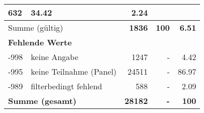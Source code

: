 \begin{longtable}{lXrrr}
       \num{632} &
       \num[round-mode=places,round-precision=2]{34.42} &
         \num[round-mode=places,round-precision=2]{2.24} \\
     \midrule
     \multicolumn{2}{l}{Summe (gültig)} &
       \textbf{\num{1836}} &
     \textbf{100} &
       \textbf{\num[round-mode=places,round-precision=2]{6.51}} \\
     \multicolumn{5}{l}{\textbf{Fehlende Werte}}\\
       -998 &
       keine Angabe &
         \num{1247} &
        - &
         \num[round-mode=places,round-precision=2]{4.42} \\
       -995 &
       keine Teilnahme (Panel) &
         \num{24511} &
        - &
         \num[round-mode=places,round-precision=2]{86.97} \\
       -989 &
       filterbedingt fehlend &
         \num{588} &
        - &
         \num[round-mode=places,round-precision=2]{2.09} \\
     \midrule
     \multicolumn{2}{l}{\textbf{Summe (gesamt)}} &
          \textbf{\num{28182}} &
        \textbf{-} &
        \textbf{100} \\
     \bottomrule
     \end{longtable}
     
